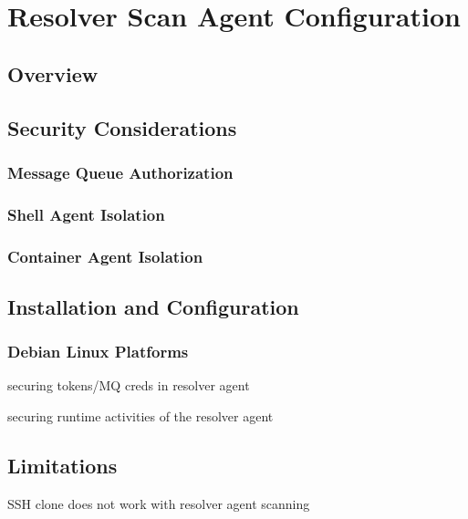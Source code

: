 \section{Resolver Scan Agent Configuration}\label{sec:resolver-agent}

\subsection{Overview}





\subsection{Security Considerations}\label{sec:resolver-agent-security}

\subsubsection{Message Queue Authorization}

\subsubsection{Shell Agent Isolation}

\subsubsection{Container Agent Isolation}


\subsection{Installation and Configuration}

\subsubsection{Debian Linux Platforms}

securing tokens/MQ creds in resolver agent

securing runtime activities of the resolver agent


\subsection{Limitations}
SSH clone does not work with resolver agent scanning
